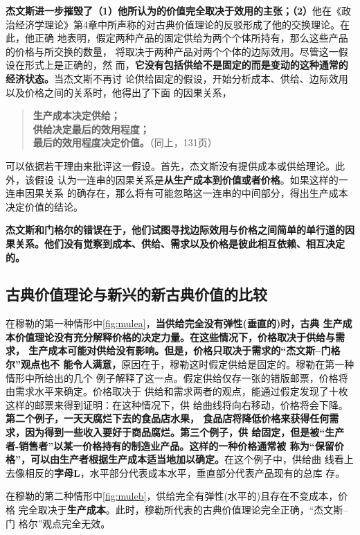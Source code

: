 \textbf{杰文斯进一步摧毁了（1）他所认为的价值完全取决于效用的主张；（2）}他在《政
治经济学理论》第4章中所声称的对古典价值理论的反驳形成了他的交换理论。在此，他正确
地表明，假定两种产品的固定供给为两个个体所持有，那么这些产品的价格与所交换的数量，
将取决于两种产品对两个个体的边际效用。尽管这一假设在形式上是正确的，然
而，\textbf{它没有包括供给不是固定的而是变动的这种通常的经济状态。}当杰文斯不再讨
论供给固定的假设，开始分析成本、供给、边际效用以及价格之间的关系时，他得出了下面
的因果关系，

\begin{quotation}
  \noindent \textbf{生产成本决定供给；\\
    供给决定最后的效用程度；\\
    最后的效用程度决定价值。}（同上，131页）
\end{quotation}

可以依据若干理由来批评这一假设。首先，杰文斯没有提供成本或供给理论。此外，该假设
认为一连串的因果关系是\textbf{从生产成本到价值或者价格}。如果这样的一连串因果关系
的确存在，那么将有可能忽略这一连串的中间部分，得出生产成本决定价值的结论。

\textbf{杰文斯和门格尔的错误在于，他们试图寻找边际效用与价格之间简单的单行道的因
  果关系。他们没有觉察到成本、供给、需求以及价格是彼此相互依赖、相互决定的。}

\subsection{古典价值理论与新兴的新古典价值的比较}

在穆勒的第一种情形中\cref{fig:mulea}，\textbf{当供给完全没有弹性(垂直的)时，古典
  生产成本价值理论没有充分解释价格的决定力量。在这些情况下，价格取决于供给与需求，
  生产成本可能对供给没有影响。但是，价格只取决于需求的“杰文斯--门格尔”观点也不
  能令人满意，}原因在于，穆勒这时假定供给是固定的。穆勒在第一种情形中所给出的几个
例子解释了这一点。假定供给仅存一张的错版邮票，价格将由需求水平来确定。价格取决于
供给和需求两者的观点，能通过假定发现了十枚这样的邮票来得到证明：在这种情况下，供
给曲线将向右移动，价格将会下降。\textbf{第二个例子，一天天腐烂下去的食品店水果，
  食品店将降低价格来获得任何需求，因为得到一些收入要好于商品腐烂。第三个例子，供
  给固定，但是被“生产者-销售者”以某一价格持有的制造业产品。这样的一种价格通常被
  称为“保留价格”，可以由生产者根据生产成本适当地加以确定。}在这个例子中，供给曲
线看上去像相反的\textbf{字母L}，水平部分代表成本水平，垂直部分代表产品现有的总库
存。

在穆勒的第二种情形中\cref{fig:muleb}，供给完全有弹性(水平的)且存在不变成本，价格
完全取决于\textbf{生产成本}。此时，穆勒所代表的古典价值理论完全正确，“杰文斯--门
格尔”观点完全无效。

